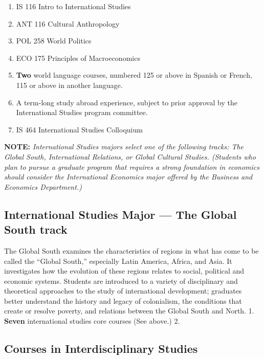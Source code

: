 \documentclass[
  letterpaper,
]{scrbook}
\providecommand{\tightlist}{%
  \setlength{\itemsep}{0pt}\setlength{\parskip}{0pt}}
\begin{document}
\begin{enumerate}
\def\labelenumi{\arabic{enumi}.}
\tightlist
\item
  IS 116 Intro to International Studies
\item
  ANT 116 Cultural Anthropology
\item
  POL 258 World Politics
\item
  ECO 175 Principles of Macroeconomics
\item
  \textbf{Two} world language courses, numbered 125 or above in Spanish
  or French, 115 or above in another language.
\item
  A term-long study abroad experience, subject to prior approval by the
  International Studies program committee.
\item
  IS 464 International Studies Colloquium
\end{enumerate}

\textbf{NOTE:} \emph{International Studies majors select one of the
following tracks: The Global South, International Relations, or Global
Cultural Studies. (Students who plan to pursue a graduate program that
requires a strong foundation in economics should consider the
International Economics major offered by the Business and Economics
Department.)}

\hypertarget{international-studies-major-the-global-south-track}{%
\subsection{International Studies Major --- The Global South
track}\label{international-studies-major-the-global-south-track}}

The Global South examines the characteristics of regions in what has
come to be called the ``Global South,'' especially Latin America,
Africa, and Asia. It investigates how the evolution of these regions
relates to social, political and economic systems. Students are
introduced to a variety of disciplinary and theoretical approaches to
the study of international development; graduates better understand the
history and legacy of colonialism, the conditions that create or resolve
poverty, and relations between the Global South and North. 1.
\textbf{Seven} international studies core courses (See above.) 2.

\hypertarget{courses-in-interdisciplinary-studies-1}{%
\subsection{Courses in Interdisciplinary
Studies}\label{courses-in-interdisciplinary-studies-1}}
\end{document}
